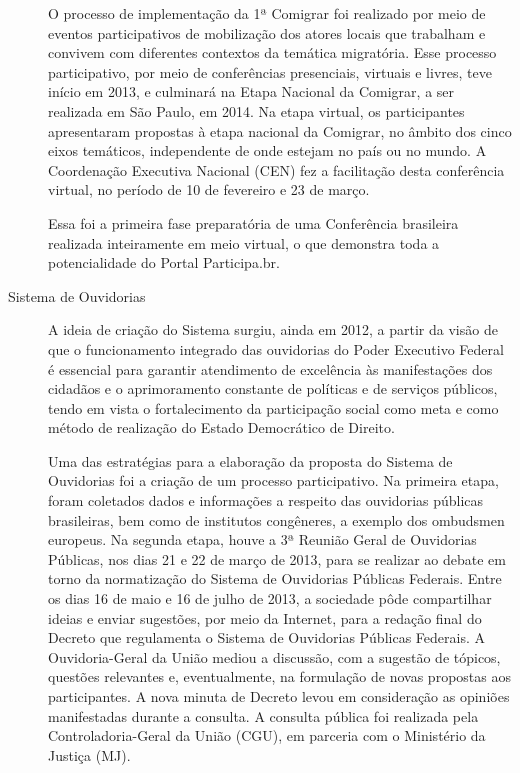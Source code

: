 \documentclass{article}
\begin{document}
\begin{description}
  O processo de implementação da 1ª Comigrar foi realizado por meio de eventos
  participativos de mobilização dos atores locais que trabalham e convivem com
  diferentes contextos da temática migratória. Esse processo participativo, por
  meio de conferências presenciais, virtuais e livres, teve início em 2013, e
  culminará na Etapa Nacional da Comigrar, a ser realizada em São Paulo, em
  2014. Na etapa virtual, os participantes apresentaram propostas à etapa
  nacional da Comigrar, no âmbito dos cinco eixos temáticos, independente de
  onde estejam no país ou no mundo. A Coordenação Executiva Nacional (CEN) fez
  a facilitação desta conferência virtual, no período de 10 de fevereiro e 23
  de março.

  Essa foi a primeira fase preparatória de uma Conferência brasileira realizada
  inteiramente em meio virtual, o que demonstra toda a potencialidade do Portal
  Participa.br.

  \item [Sistema de Ouvidorias]

  A ideia de criação do Sistema surgiu, ainda em 2012, a partir da visão de que
  o funcionamento integrado das ouvidorias do Poder Executivo Federal é
  essencial para garantir atendimento de excelência às manifestações dos
  cidadãos e o aprimoramento constante de políticas e de serviços públicos,
  tendo em vista o fortalecimento da participação social como meta e como
  método de realização do Estado Democrático de Direito.

  Uma das estratégias para a elaboração da proposta do Sistema de Ouvidorias
  foi a criação de um processo participativo. Na primeira etapa, foram
  coletados dados e informações a respeito das ouvidorias públicas brasileiras,
  bem como de institutos congêneres, a exemplo dos ombudsmen europeus. Na
  segunda etapa, houve a 3ª Reunião Geral de Ouvidorias Públicas, nos dias 21 e
  22 de março de 2013, para se realizar ao debate em torno da normatização do
  Sistema de Ouvidorias Públicas Federais. Entre os dias 16 de maio e 16 de
  julho de 2013, a sociedade pôde compartilhar ideias e enviar sugestões, por
  meio da Internet, para a redação final do Decreto que regulamenta o Sistema
  de Ouvidorias Públicas Federais. A Ouvidoria-Geral da União mediou a
  discussão, com a sugestão de tópicos, questões relevantes e, eventualmente,
  na formulação de novas propostas aos participantes. A nova minuta de Decreto
  levou em consideração as opiniões manifestadas durante a consulta. A consulta
  pública foi realizada pela Controladoria-Geral da União (CGU), em parceria
  com o Ministério da Justiça (MJ).


\end{description}
\end{document}

